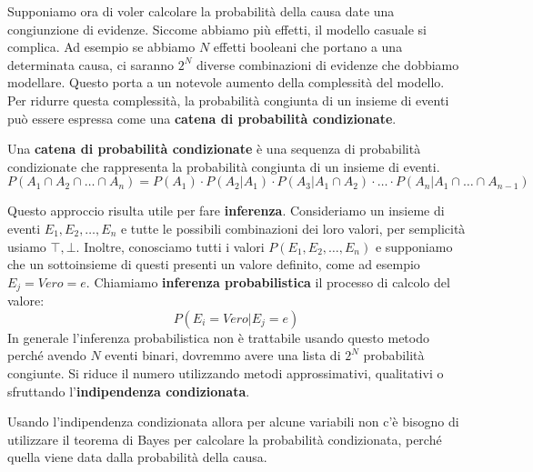 Supponiamo ora di voler calcolare la probabilità della causa date una congiunzione
di evidenze. Siccome abbiamo più effetti, il modello casuale si complica.
Ad esempio se abbiamo $N$ effetti booleani che portano a una determinata causa,
ci saranno $2^N$ diverse combinazioni di evidenze che dobbiamo modellare.
Questo porta a un notevole aumento della complessità del modello.
Per ridurre questa complessità, la probabilità congiunta di un insieme di eventi
può essere espressa come una \textbf{catena di probabilità condizionate}.
\begin{definizione}
    Una \textbf{catena di probabilità condizionate} è una sequenza di probabilità
    condizionate che rappresenta la probabilità congiunta di un insieme di eventi.
    \begin{equation}
        P(A_1 \cap A_2 \cap \ldots \cap A_n) = P(A_1) \cdot P(A_2|A_1) \cdot
        P(A_3|A_1 \cap A_2) \cdot \ldots \cdot P(A_n|A_1 \cap \ldots \cap A_{n-1})
    \end{equation}
\end{definizione}
Questo approccio risulta utile per fare \textbf{inferenza}. Consideriamo un
insieme di eventi $E_1, E_2, \dots, E_n$ e tutte le possibili combinazioni dei
loro valori, per semplicità usiamo $\top, \bot$. Inoltre, conosciamo tutti i
valori $P(E_1, E_2, \dots, E_n)$ e supponiamo che un sottoinsieme di questi
presenti un valore definito, come ad esempio $E_j = Vero = e$.
Chiamiamo \textbf{inferenza probabilistica} il processo di calcolo del valore:
\begin{equation}
    P(E_i = Vero|E_j=e)
\end{equation}
In generale l'inferenza probabilistica non è trattabile usando questo metodo
perché avendo $N$ eventi binari, dovremmo avere una lista di $2^N$ probabilità 
congiunte. Si riduce il numero utilizzando metodi approssimativi, qualitativi o 
sfruttando l'\textbf{indipendenza condizionata}.

Usando l'indipendenza condizionata allora per alcune variabili non c'è bisogno di
utilizzare il teorema di Bayes per calcolare la probabilità condizionata, perché
quella viene data dalla probabilità della causa.

